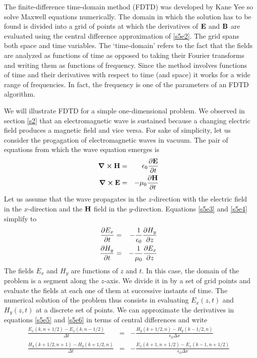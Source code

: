 \documentclass[11pt]{article}
\numberwithin{equation}{section}
\begin{document}
The finite-difference time-domain method (FDTD) was developed by Kane Yee
\cite{yee1966numerical} so solve Maxwell equations numerically. The domain
in which the solution has to be found is divided into a grid of points at
which the derivatives of $\vb{E}$ and $\vb{B}$ are evaluated using the
central difference approximation of \eqref{s5e2}. The grid spans both space
and time variables. The `time-domain' refers to the fact that the fields are
analyzed as functions of time as opposed to taking their Fourier transforms
and writing them as functions of frequency. Since the method involves
functions of time and their derivatives with respect to time (and space)
it works for a wide range of frequencies. In fact, the frequency is one of
the parameters of an FDTD algorithm.

We will illustrate FDTD for a simple one-dimensional problem. We observed
in section \ref{s2} that an electromagnetic wave is sustained because a 
changing electric field produces a magnetic field and vice versa. For sake
of simplicity, let us consider the progagation of electromagnetic waves in
vacuum. The pair of equations from which the wave equation emerges is
\begin{eqnarray}
\curl\vb{H} &=& \epsilon_0\pdv{\vb{E}}{t} \label{s5e3} \\
\curl\vb{E} &=& -\mu_0\pdv{\vb{H}}{t} \label{s5e4}
\end{eqnarray}
Let us assume that the wave propagates in the $z$-direction with the 
electric field in the $x$-direction and the $\vb{H}$ field in the
$y$-direction. Equations \eqref{s5e3} and \eqref{s5e4} simplify to
\begin{eqnarray}
\pdv{E_x}{t} &=& -\frac{1}{\epsilon_0}\pdv{H_y}{z} \label{s5e5} \\
\pdv{H_y}{t} &=& -\frac{1}{\mu_0}\pdv{E_x}{z} \label{s5e6}
\end{eqnarray}
The fields $E_x$ and $H_y$ are functions of $z$ and $t$. In this case, the
domain of the problem is a segment along the $z$-axis. We divide it in by a 
set of grid points and evaluate the fields at each one of them at successive
instants of time. The numerical solution of the problem thus consists in
evaluating $E_x(z, t)$ and $H_y(z, t)$ at a discrete set of points. We can
approximate the derivatives in equations \eqref{s5e5} and \eqref{s5e6} in
terms of central differences and write \cite{sullivan2013electromagnetic}
\begin{eqnarray}
\frac{E_x(k, n + 1/2) - E_x(k, n - 1/2)}{\Delta t} 
 &=& -\frac{H_y(k + 1/2, n) - H_y(k - 1/2, n)}{\epsilon_0\Delta x}
\label{s5e7} \\
\frac{H_y(k + 1/2, n + 1) - H_y(k + 1/2, n)}{\Delta t} 
&=&
-\frac{E_x(k + 1, n + 1/2) - E_x(k - 1, n + 1/2)}{\epsilon_0\Delta x}
\nonumber \\
 & & \label{s5e8} 
\end{eqnarray}
\end{document}
